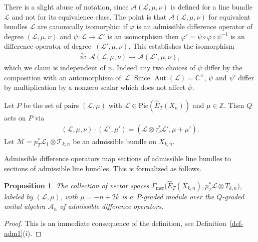 \documentclass[10pt,a4paper]{amsart}
\numberwithin{equation}{section}
\newtheorem{Proposition}[Theorem]{Proposition}
 { \theoremstyle{definition}
\newtheorem{Definition}[Theorem]{Definition}
\newtheorem{Example}[Theorem]{Example}
\newtheorem{Remark}[Theorem]{Remark} }
\begin{document}
\begin{Remark} There is a slight abuse of notation, since $\mathcal A(\mathcal L,\mu,\nu)$ is defined for a line bundle~$\mathcal L$ and not for its equivalence class. The point is that $\mathcal A(\mathcal L,\mu,\nu)$ for equivalent bundles $\mathcal L$ are canonically isomorphic: if $\varphi$ is an admissible difference operator of degree $(\mathcal L,\mu,\nu)$ and $\psi\colon \mathcal L\to \mathcal L'$ is an isomorphism then $\varphi'=\psi\circ\varphi\circ\psi^{-1}$ is an difference operator of degree~$(\mathcal L',\mu,\nu)$. This establishes the isomorphism
 \begin{gather*}
 \bar\psi\colon \ \mathcal A(\mathcal L,\mu,\nu)\to \mathcal A(\mathcal L',\mu,\nu),
 \end{gather*}
 which we claim is independent of $\psi$. Indeed any two choices of $\psi$ differ by the composition with an automorphism of~$\mathcal L$. Since $\operatorname{Aut}(\mathcal L)=\mathbb C^\times$, $\psi$ and $\psi'$ differ by multiplication by a nonzero scalar which does not affect $\bar \psi$.
\end{Remark}
Let $P$ be the set of pairs $(\mathcal L,\mu)$ with $\mathcal L\in\mathrm{Pic}(\hat E_T(X_n))$ and $\mu\in\mathbb Z$. Then $Q$ acts on $P$ via
\begin{gather*}
 (\mathcal L,\mu,\nu)\cdot(\mathcal L',\mu') = (\mathcal L\otimes\tau_\nu^*\mathcal L',\mu+\mu').
\end{gather*}
Let $\mathcal M=p_T^*\mathcal L_1\otimes \mathcal T_{k,n}$ be an admissible bundle on $X_{k,n}$.

Admissible difference operators map sections of admissible line bundles to sections of admissible line bundles. This is formalized as follows.
\begin{Proposition} The collection of vector spaces $\Gamma_{\mathrm{mer}}\big(\hat E_T(X_{k,n}),p_T^*\mathcal L\otimes T_{k,n}\big)$, labeled by $(\mathcal L,\mu)$, with $\mu=-n+2k$ is a~$P$-graded module over the $Q$-graded unital algebra $\mathcal A_n$ of admissible difference operators.
\end{Proposition}
\begin{proof} This is an immediate consequence of the definition, see Definition~\ref{def-adm1}(i).
\end{proof}
\end{document}
